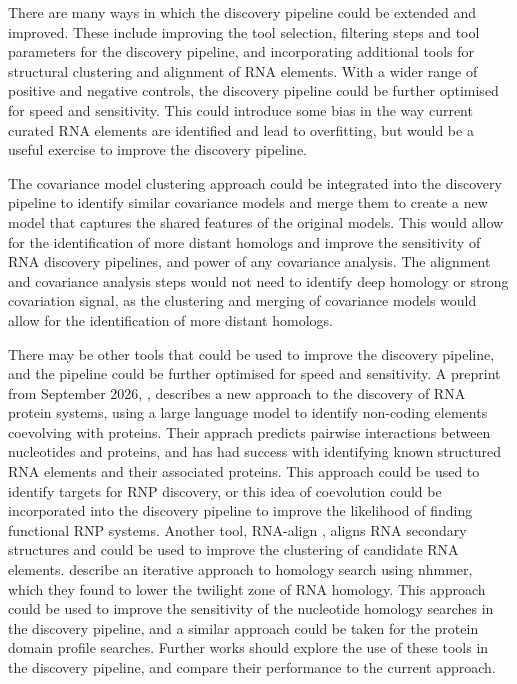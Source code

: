 There are many ways in which the discovery pipeline could be extended and improved.
These include improving the tool selection, filtering steps and tool parameters for the discovery pipeline, and incorporating additional tools for structural clustering and alignment of RNA elements.
With a wider range of positive and negative controls, the discovery pipeline could be further optimised for speed and sensitivity.
This could introduce some bias in the way current curated RNA elements are identified and lead to overfitting, but would be a useful exercise to improve the discovery pipeline.

The covariance model clustering approach could be integrated into the discovery pipeline to identify similar covariance models and merge them to create a new model that captures the shared features of the original models.
This would allow for the identification of more distant homologs and improve the sensitivity of RNA discovery pipelines, and power of any covariance analysis.
The alignment and covariance analysis steps would not need to identify deep homology or strong covariation signal, as the clustering and merging of covariance models would allow for the identification of more distant homologs.

There may be other tools that could be used to improve the discovery pipeline, and the pipeline could be further optimised for speed and sensitivity.
A preprint from September 2026, \citet{Li2026}, describes a new approach to the discovery of RNA protein systems, using a large language model to identify non-coding elements coevolving with proteins.
Their apprach predicts pairwise interactions between nucleotides and proteins, and has had success with identifying known structured RNA elements and their associated proteins.
This approach could be used to identify targets for \ac{RNP} discovery, or this idea of coevolution could be incorporated into the discovery pipeline to improve the likelihood of finding functional \ac{RNP} systems.
Another tool, RNA-align \citep{Gong2019}, aligns RNA secondary structures and could be used to improve the clustering of candidate RNA elements.
\citet{McGimpsey2019} describe an iterative approach to homology search using nhmmer, which they found to lower the twilight zone of RNA homology.
This approach could be used to improve the sensitivity of the nucleotide homology searches in the discovery pipeline, and a similar approach could be taken for the protein domain profile searches.
Further works should explore the use of these tools in the discovery pipeline, and compare their performance to the current approach.

